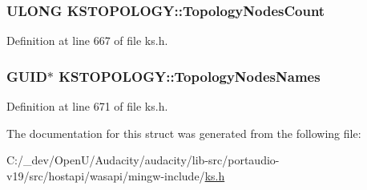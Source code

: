 \subsubsection[{\texorpdfstring{Topology\+Nodes\+Count}{TopologyNodesCount}}]{\setlength{\rightskip}{0pt plus 5cm}U\+L\+O\+NG K\+S\+T\+O\+P\+O\+L\+O\+G\+Y\+::\+Topology\+Nodes\+Count}\hypertarget{struct_k_s_t_o_p_o_l_o_g_y_ac88044b4b2c511b80f071440c51841cd}{}\label{struct_k_s_t_o_p_o_l_o_g_y_ac88044b4b2c511b80f071440c51841cd}


Definition at line 667 of file ks.\+h.

\subsubsection[{\texorpdfstring{Topology\+Nodes\+Names}{TopologyNodesNames}}]{ G\+U\+ID$\ast$ K\+S\+T\+O\+P\+O\+L\+O\+G\+Y\+::\+Topology\+Nodes\+Names}\hypertarget{struct_k_s_t_o_p_o_l_o_g_y_abc30ee7bd51b50bdefa11a475e4fb840}{}\label{struct_k_s_t_o_p_o_l_o_g_y_abc30ee7bd51b50bdefa11a475e4fb840}


Definition at line 671 of file ks.\+h.



The documentation for this struct was generated from the following file\+:\begin{DoxyCompactItemize}
\item 
C\+:/\+\_\+dev/\+Open\+U/\+Audacity/audacity/lib-\/src/portaudio-\/v19/src/hostapi/wasapi/mingw-\/include/\hyperlink{ks_8h}{ks.\+h}\end{DoxyCompactItemize}
